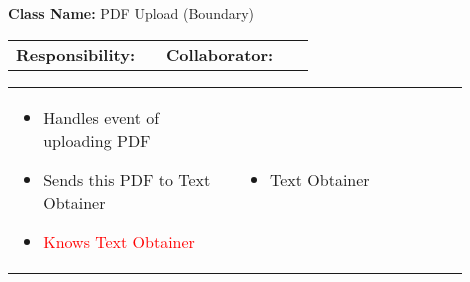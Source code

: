\begin{cards}[]
    \textbf{Class Name:} PDF Upload (Boundary)
    \tcbline
    \begin{tabular}{p{0.45\linewidth} | p{0.45\linewidth}}
        \textbf{Responsibility:}& 
        \textbf{Collaborator:}\\
    \end{tabular}
    \tcbline
    \begin{tabular}{p{0.45\linewidth} | p{0.45\linewidth}}
        \begin{itemize}
            \item Handles event of uploading PDF
            \item Sends this PDF to Text Obtainer
            \item \textcolor{red}{Knows Text Obtainer}
        \end{itemize}
        &
        \begin{itemize}
            \item Text Obtainer
        \end{itemize}
    \end{tabular}
\end{cards}